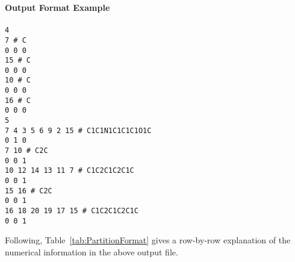 \documentclass[11pt,titlepage,dvipdfmx,twoside]{article}
\begin{document}
\begin{oframed}
{\bf Output Format Example}\\\\
{\tt 4 \\
7 \# C \\
0 0 0 \\
15 \# C \\
0 0 0 \\
10 \# C \\
0 0 0 \\
16 \# C \\
0 0 0 \\
5 \\
7 4 3 5 6 9 2 15 \# C1C1N1C1C1C1O1C \\
0 1 0 \\
7 10 \# C2C \\
0 0 1 \\
10 12 14 13 11 7 \# C1C2C1C2C1C \\
0 0 1 \\
15 16 \# C2C \\
0 0 1 \\
16 18 20 19 17 15 \# C1C2C1C2C1C \\
0 0 1 \\}
\end{oframed}


Following, Table~\ref{tab:PartitionFormat}
gives a row-by-row explanation of the numerical information in the
above output file.
\end{document}
